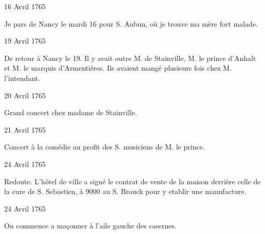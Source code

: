                      \begin{diary}{16 Avril 1765}{}

                         Je pars de Nancy
                           le mardi 16 pour S.
                              Aubun, où je trouve ma
                              mère fort malade. \bigskip


                     \end{diary}

                     \begin{diary}{19 Avril 1765}{}

                         De retour à Nancy
                           le 19. Il y avait outre
                           M. de Stainville, M. le prince d'Anhalt et M.
                              le marquis d'Armentières. Ils avaient mangé
                           plusieurs fois chez
                           M. l'intendant. \bigskip


                     \end{diary}

                     \begin{diary}{20 Avril 1765}{}

                         Grand concert chez
                           madame de Stainville. \bigskip


                     \end{diary}

                     \begin{diary}{21 Avril 1765}{}

                         Concert à la comédie au profit des S.
                            musiciens de M. le prince. \bigskip


                     \end{diary}

                     \begin{diary}{24 Avril 1765}{}

                         Redoute. L'hôtel de ville a signé le contrat
                           de vente de la maison derrière celle de la
                              cure de S. Sebastien, à 9000\up{\#} au S. Brouck
                           pour y etablir une manufacture. \bigskip


                     \end{diary}


                     \begin{diary}{24 Avril 1765}{}

                         On commence a maçonner à l'aile
                           gauche
                           des casernes. \bigskip


                     \end{diary}


